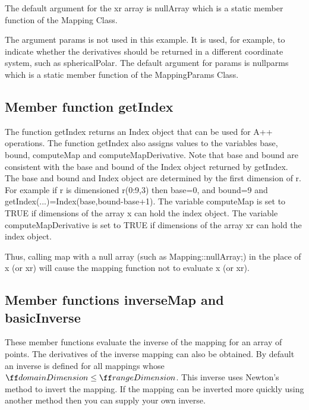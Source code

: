 \documentclass[xcolor=rgb,svgnames,dvipsnames]{article}
\newcommand{\Index}[1]{#1\index{#1}}
\begin{document}
The default
argument for the {\ff xr} array is {\ff nullArray} which is a static 
member function of the Mapping Class. 

The argument {\ff params} is not used in this example. It is used, for example,
to indicate whether the derivatives should be returned in a different coordinate system,
such as sphericalPolar.
The default
argument for {\ff params} is {\ff nullparms} which is a static 
member function of the MappingParams Class.

\subsection{Member function {\ff getIndex }}

The function {\ff \Index{getIndex}} returns an Index object that
can be used for A++ operations. The function {\ff getIndex} also assigns
values to the
variables {\ff base}, {\ff bound}, {\ff computeMap} and
{\ff computeMapDerivative}. Note that {\ff base} and {\ff bound} are
consistent with the base and bound of the Index object returned by
{\ff getIndex}.
The base and bound and Index object
are determined by the first dimension of {\ff r}. For example
if {\ff r} is dimensioned {\ff r(0:9,3)} then {\ff base=0}, and
{\ff bound=9} and {\ff getIndex(...)=Index(base,bound-base+1)}.  
The variable {\ff computeMap} is set to {\ff TRUE}
if dimensions of the array {\ff x} can hold the index object.
The variable {\ff computeMapDerivative} is set to {\ff TRUE}
if dimensions of the array {\ff xr} can hold the index object.

Thus, calling map with a null array (such as {\ff Mapping::nullArray;})
in the place of {\ff x} (or {\ff xr}) will cause the mapping function
not to evaluate {\ff x} (or {\ff xr}).

\subsection{Member functions {\ff \Index{inverseMap}} and {\ff \Index{basicInverse}}}

These member functions evaluate the inverse of the mapping for
an array of points. The derivatives of the inverse mapping can
also be obtained. By default an inverse is defined for
all mappings
whose ${\ff domainDimension} \le {\ff rangeDimension}$. 
This inverse uses Newton's method to invert the mapping.
If the mapping can be inverted more quickly using
another method then you can supply your own inverse.
\end{document}

